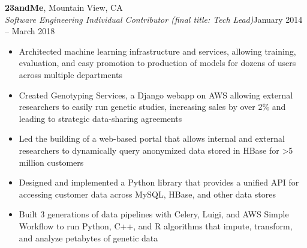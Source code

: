 \documentclass[margin,line]{resume}
\begin{document}
\begin{resume}
    \textbf{23andMe}, Mountain View, CA \hfill\vspace{1mm}\\\vspace{1mm}%
    \textsl{Software Engineering Individual Contributor (final title: Tech Lead)}\hfill January 2014 -- March 2018\\%
    \begin{itemize}
    \item Architected machine learning infrastructure and services, allowing training, evaluation, and easy promotion to production of models for dozens of users across multiple departments
    \item Created Genotyping Services, a Django webapp on AWS allowing external researchers to easily run genetic studies, increasing sales by over 2\% and leading to strategic data-sharing agreements
    \item Led the building of a web-based portal that allows internal and external researchers to dynamically query anonymized data stored in HBase for \textgreater 5 million customers
    \item Designed and implemented a Python library that provides a unified API for accessing customer data across MySQL, HBase, and other data stores
    \item Built 3 generations of data pipelines with Celery, Luigi, and AWS Simple Workflow to run Python, C++, and R algorithms that impute, transform, and analyze petabytes of genetic data
    \end{itemize}



\end{resume}
\end{document}
